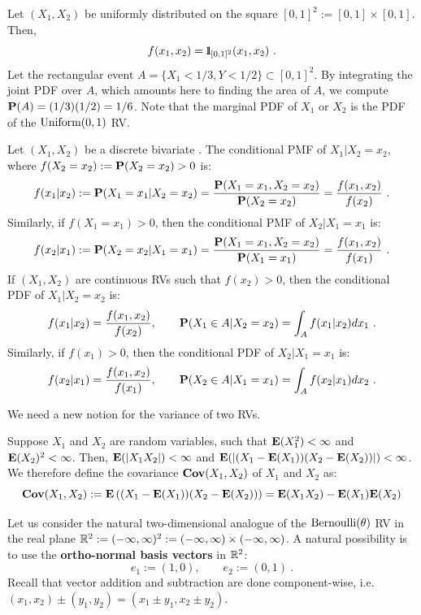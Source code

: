 \begin{example}  Let $(X_1,X_2)$ be uniformly distributed on the square $[0,1]^2 := [0,1] \times [0,1]$.  Then,
\[
f(x_1,x_2) = {1}\mspace{-11 mu}{1}_{[0,1]^2}(x_1,x_2) \ .
\]
Let the rectangular event $A=\{X_1 < 1/3, Y < 1/2 \} \subset [0,1]^2$.  By integrating the joint PDF over $A$, which amounts here to finding the area of $A$, we compute $\mathbf{P}(A) = (1/3) (1/2) = 1/6$.  Note that the marginal PDF of $X_1$ or $X_2$ is the PDF of the $\mbox{{\rm Uniform}}(0,1)$ RV.
\end{example}

\begin{definition}
Let $(X_1,X_2)$ be a discrete bivariate \rv.  The conditional PMF of $X_1|X_2=x_2$, where $f(X_2=x_2) := \mathbf{P}(X_2=x_2) > 0$ is:
\[
f(x_1|x_2) := \mathbf{P}(X_1=x_1 | X_2=x_2) = \frac{\mathbf{P}(X_1=x_1,X_2=x_2)}{\mathbf{P}(X_2=x_2)} = \frac{f(x_1,x_2)}{f(x_2)} \ .
\]
Similarly, if $f(X_1=x_1)>0$, then the conditional PMF of $X_2|X_1=x_1$ is:
\[
f(x_2|x_1) := \p(X_2=x_2 | X_1=x_1) = \frac{\p(X_1=x_1,X_2=x_2)}{\p(X_1=x_1)} = \frac{f(x_1,x_2)}{f(x_1)} \ .
\]
If $(X_1,X_2)$ are continuous RVs such that $f(x_2)>0$, then the conditional PDF of $X_1|X_2=x_2$ is:
\[
f(x_1|x_2) = \frac{f(x_1,x_2)}{f(x_2)}, \qquad \mathbf{P}(X_1 \in A| X_2=x_2) = \int_A f(x_1|x_2) dx_1 \ .
\]
Similarly, if $f(x_1)>0$, then the conditional PDF of $X_2|X_1=x_1$ is:
\[
f(x_2|x_1) = \frac{f(x_1,x_2)}{f(x_1)}, \qquad \mathbf{P}(X_2 \in A| X_1=x_1) = \int_A f(x_2|x_1) dx_2 \ .
\]
\end{definition}
We need a new notion for the variance of two RVs.
\begin{definition}[Covariance]
Suppose $X_1$ and $X_2$ are random variables, such that $\mathbf{E}(X_1^2) < \infty$ and $\mathbf{E}(X_2)^2 < \infty$.  Then, $\mathbf{E}(|X_1 X_2|) < \infty$ and $\mathbf{E}(|(X_1-\mathbf{E}(X_1))(X_2-\mathbf{E}(X_2))|) < \infty$.  We therefore define the covariance $\mathbf{Cov}(X_1,X_2)$ of $X_1$ and $X_2$ as:
\[
\mathbf{Cov}(X_1,X_2) := \mathbf{E} \left((X_1-\mathbf{E}(X_1))(X_2-\mathbf{E}(X_2))\right) = \mathbf{E}(X_1 X_2) - \mathbf{E}(X_1) \mathbf{E}(X_2)
\]
\end{definition}

Let us consider the natural two-dimensional analogue of the $\mbox{{\rm Bernoulli}}(\theta)$ RV in the real plane $\mathbb{R}^2 := (-\infty,\infty)^2 := (-\infty,\infty) \times (-\infty,\infty)$.  A natural possibility is to use the {\bf ortho-normal basis vectors} in $\mathbb{R}^2$:
$$ \boxed{
e_1 := (1,0), \qquad e_2 := (0,1)
} \ .$$
Recall that vector addition and subtraction are done component-wise, i.e.~$(x_1,x_2) \pm (y_1,y_2) = (x_1\pm y_1,x_2 \pm y_2)$.

